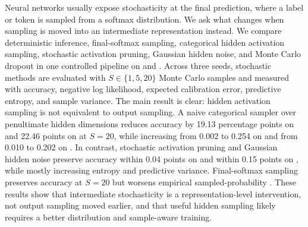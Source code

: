 Neural networks usually expose stochasticity at the final prediction, where a label or token is sampled from a softmax distribution. We ask what changes when sampling is moved into an intermediate representation instead. We compare deterministic inference, final-softmax sampling, categorical hidden activation sampling, stochastic activation pruning, Gaussian hidden noise, and Monte Carlo dropout in one controlled \cnn pipeline on \mnist and \fashionmnist. Across three seeds, stochastic methods are evaluated with $S \in \{1,5,20\}$ Monte Carlo samples and measured with accuracy, negative log likelihood, expected calibration error, predictive entropy, and sample variance. The main result is clear: hidden activation sampling is not equivalent to output sampling. A naive categorical sampler over penultimate hidden dimensions reduces accuracy by 19.13 percentage points on \mnist and 22.46 points on \fashionmnist at $S=20$, while increasing \ece from 0.002 to 0.254 on \mnist and from 0.010 to 0.202 on \fashionmnist. In contrast, stochastic activation pruning and Gaussian hidden noise preserve accuracy within 0.04 points on \mnist and within 0.15 points on \fashionmnist, while mostly increasing entropy and predictive variance. Final-softmax sampling preserves accuracy at $S=20$ but worsens empirical sampled-probability \nll. These results show that intermediate stochasticity is a representation-level intervention, not output sampling moved earlier, and that useful hidden sampling likely requires a better distribution and sample-aware training.
